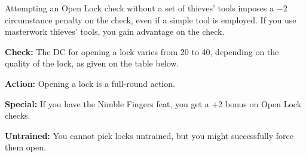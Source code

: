 Attempting an Open Lock check without a set of thieves' tools imposes a $-2$ circumstance penalty on the check, even if a simple tool is employed. If you use masterwork thieves' tools, you gain advantage on the check.

\textbf{Check:} The DC for opening a lock varies from 20 to 40, depending on the quality of the lock, as given on the table below.


\textbf{Action:} Opening a lock is a full-round action.

\textbf{Special:} If you have the Nimble Fingers feat, you get a +2 bonus on Open Lock checks.

\textbf{Untrained:} You cannot pick locks untrained, but you might successfully force them open.
